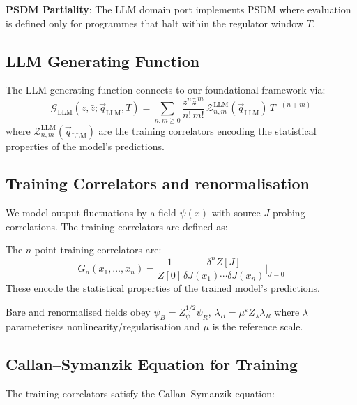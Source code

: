 \textbf{PSDM Partiality}: The LLM domain port implements PSDM where evaluation is defined only for programmes that halt within the regulator window $T$.

\subsection{LLM Generating Function}

The LLM generating function connects to our foundational framework via:
\begin{equation}
\mathcal{G}_{\text{LLM}}(z, \bar{z}; \vec{q}_{\text{LLM}}, T) = \sum_{n,m\ge0}\frac{z^n\bar{z}^{\,m}}{n!\,m!}\,\mathcal{Z}_{n,m}^{\text{LLM}}(\vec{q}_{\text{LLM}})\,T^{-(n+m)} \label{eq:llm-generating-function}
\end{equation}
where $\mathcal{Z}_{n,m}^{\text{LLM}}(\vec{q}_{\text{LLM}})$ are the training correlators encoding the statistical properties of the model's predictions.

\subsection{Training Correlators and renormalisation}

We model output fluctuations by a field $\psi(x)$ with source $J$ probing correlations. The training correlators are defined as:

\begin{definition}
\label{def:training-correlators}
The $n$-point training correlators are:
\begin{equation}
  G_n(x_1,\ldots,x_n) = \frac{1}{Z[0]} \frac{\delta^n Z[J]}{\delta J(x_1) \cdots \delta J(x_n)} \bigg|_{J=0}
  \label{eq:n_point_correlator}
\end{equation}
These encode the statistical properties of the trained model's predictions.
\end{definition}

Bare and renormalised fields obey $\psi_B = Z_\psi^{1/2}\psi_R$, $\lambda_B=\mu^\varepsilon Z_\lambda \lambda_R$ where $\lambda$ parameterises nonlinearity/regularisation and $\mu$ is the reference scale.

\subsection{Callan–Symanzik Equation for Training}

The training correlators satisfy the Callan--Symanzik equation:

